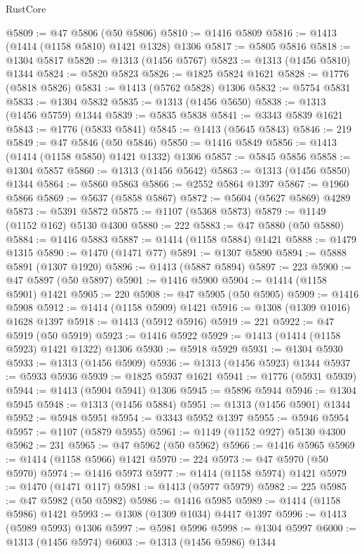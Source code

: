 \begin{lexlean}{RustCore}
\begin{coremodule}
@5809 := @47 @5806 (@50 @5806)
@5810 := @1416 @5809
@5816 := @1413 (@1414 (@1158 @5810) @1421 @1328) @1306
@5817 := @5805 @5816
@5818 := @1304 @5817
@5820 := @1313 (@1456 @5767)
@5823 := @1313 (@1456 @5810) @1344
@5824 := @5820 @5823
@5826 := @1825 @5824 @1621
@5828 := @1776 (@5818 @5826)
@5831 := @1413 (@5762 @5828) @1306
@5832 := @5754 @5831
@5833 := @1304 @5832
@5835 := @1313 (@1456 @5650)
@5838 := @1313 (@1456 @5759) @1344
@5839 := @5835 @5838
@5841 := @3343 @5839 @1621
@5843 := @1776 (@5833 @5841)
@5845 := @1413 (@5645 @5843)
@5846 := 219
@5849 := @47 @5846 (@50 @5846)
@5850 := @1416 @5849
@5856 := @1413 (@1414 (@1158 @5850) @1421 @1332) @1306
@5857 := @5845 @5856
@5858 := @1304 @5857
@5860 := @1313 (@1456 @5642)
@5863 := @1313 (@1456 @5850) @1344
@5864 := @5860 @5863
@5866 := @2552 @5864 @1397
@5867 := @1960 @5866
@5869 := @5637 (@5858 @5867)
@5872 := @5604 (@5627 @5869) @4289
@5873 := @5391 @5872
@5875 := @1107 (@5368 @5873)
@5879 := @1149 (@1152 @162) @5130 @4300
@5880 := 222
@5883 := @47 @5880 (@50 @5880)
@5884 := @1416 @5883
@5887 := @1414 (@1158 @5884) @1421
@5888 := @1479 @1315
@5890 := @1470 (@1471 @77)
@5891 := @1307 @5890
@5894 := @5888 @5891 (@1307 @1920)
@5896 := @1413 (@5887 @5894)
@5897 := 223
@5900 := @47 @5897 (@50 @5897)
@5901 := @1416 @5900
@5904 := @1414 (@1158 @5901) @1421
@5905 := 220
@5908 := @47 @5905 (@50 @5905)
@5909 := @1416 @5908
@5912 := @1414 (@1158 @5909) @1421
@5916 := @1308 (@1309 @1016) @1628 @1397
@5918 := @1413 (@5912 @5916)
@5919 := 221
@5922 := @47 @5919 (@50 @5919)
@5923 := @1416 @5922
@5929 := @1413 (@1414 (@1158 @5923) @1421 @1322) @1306
@5930 := @5918 @5929
@5931 := @1304 @5930
@5933 := @1313 (@1456 @5909)
@5936 := @1313 (@1456 @5923) @1344
@5937 := @5933 @5936
@5939 := @1825 @5937 @1621
@5941 := @1776 (@5931 @5939)
@5944 := @1413 (@5904 @5941) @1306
@5945 := @5896 @5944
@5946 := @1304 @5945
@5948 := @1313 (@1456 @5884)
@5951 := @1313 (@1456 @5901) @1344
@5952 := @5948 @5951
@5954 := @3343 @5952 @1397
@5955 := @5946 @5954
@5957 := @1107 (@5879 @5955)
@5961 := @1149 (@1152 @927) @5130 @4300
@5962 := 231
@5965 := @47 @5962 (@50 @5962)
@5966 := @1416 @5965
@5969 := @1414 (@1158 @5966) @1421
@5970 := 224
@5973 := @47 @5970 (@50 @5970)
@5974 := @1416 @5973
@5977 := @1414 (@1158 @5974) @1421
@5979 := @1470 (@1471 @117)
@5981 := @1413 (@5977 @5979)
@5982 := 225
@5985 := @47 @5982 (@50 @5982)
@5986 := @1416 @5985
@5989 := @1414 (@1158 @5986) @1421
@5993 := @1308 (@1309 @1034) @4417 @1397
@5996 := @1413 (@5989 @5993) @1306
@5997 := @5981 @5996
@5998 := @1304 @5997
@6000 := @1313 (@1456 @5974)
@6003 := @1313 (@1456 @5986) @1344

\end{coremodule}
\end{lexlean}
